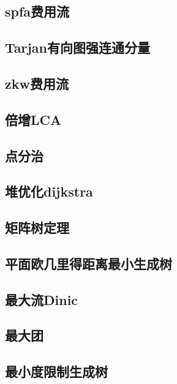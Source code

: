 \documentclass[UTF8]{ctexart}
\begin{document}
\subsection{spfa费用流}

\subsection{Tarjan有向图强连通分量}

\subsection{zkw费用流}

\subsection{倍增LCA}

\subsection{点分治}

\subsection{堆优化dijkstra}

\subsection{矩阵树定理}

\subsection{平面欧几里得距离最小生成树}

\subsection{最大流Dinic}

\subsection{最大团}

\subsection{最小度限制生成树}

\end{document}
